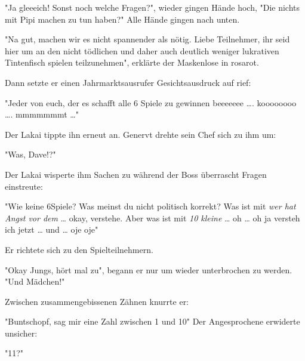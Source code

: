 \documentclass[ebook]{article}
\begin{document}
\begin{center}
"Ja gleeeich! Sonst noch welche Fragen?", wieder gingen Hände hoch,
"Die nichts mit Pipi machen zu tun haben?" Alle Hände gingen nach unten.
\end{center}

\begin{center}
"Na gut, machen wir es nicht spannender als nötig. Liebe Teilnehmer,
ihr seid hier um an den nicht tödlichen und daher auch deutlich
weniger lukrativen Tintenfisch spielen teilzunehmen", erklärte der
Maskenlose in rosarot.
\end{center}

\noindent Dann setzte er einen Jahrmarktsausrufer Gesichtsausdruck
auf rief:

\begin{center}
"Jeder von euch, der es schafft alle 6 Spiele zu gewinnen beeeeeee
\ldots{}. koooooooo \ldots{}. mmmmmmmt \ldots{}"
\end{center}

\noindent Der Lakai tippte ihn erneut an. Genervt drehte sein Chef
sich zu ihm um:

\begin{center}
"Was, Dave!?"
\end{center}

\noindent Der Lakai wisperte ihm Sachen zu während der Boss überrascht Fragen
einstreute:

\begin{center}
"Wie keine 6Spiele? Was meinst du nicht politisch korrekt? Was ist
mit \emph{wer hat Angst vor dem} \ldots{} okay, verstehe. Aber was ist mit \emph{10
kleine} \ldots{} oh \ldots{} oh ja versteh ich jetzt \ldots{} und \ldots{} oje oje"
\end{center}

\noindent Er richtete sich zu den Spielteilnehmern.

\begin{center}
"Okay Jungs, hört mal zu", begann er nur um wieder unterbrochen zu
werden. "Und Mädchen!"
\end{center}

\noindent Zwischen zusammengebissenen Zähnen knurrte er:

\begin{center}
"Buntschopf, sag mir eine Zahl zwischen 1 und 10" Der Angesprochene
erwiderte unsicher:
\end{center}

\begin{center}
"11?"
\end{center}
\end{document}
